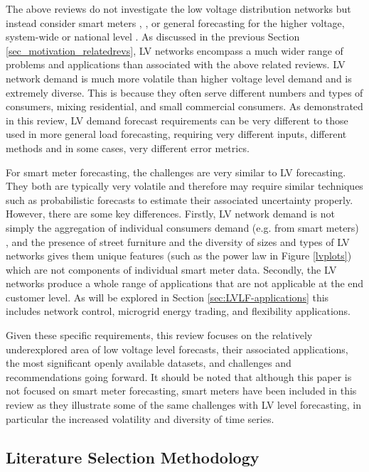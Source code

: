 The above reviews do not investigate the low voltage distribution networks but instead consider smart meters \cite{Tao2020efa}, \cite{Yildiz2017rai}, or general forecasting for the higher voltage, system-wide or national level \cite{Tao2016pel}. As discussed in the previous Section \ref{sec_motivation_relatedrevs}, LV networks encompass a much wider range of problems and applications than associated with the above related reviews. LV network demand is much more volatile than higher voltage level demand and is extremely diverse. This is because they often serve different numbers and types of consumers, mixing residential, and small commercial consumers. As demonstrated in this review, LV demand forecast requirements can be very different to those used in more general load forecasting, requiring very different inputs, different methods and in some cases, very different error metrics. 

For smart meter forecasting, the challenges are very similar to LV forecasting. They both are typically very volatile and therefore may require similar techniques such as probabilistic forecasts to estimate their associated uncertainty properly. However, there are some key differences. Firstly, LV network demand is not simply the aggregation of individual consumers demand (e.g. from smart meters) \cite{Haben2019stl}, and the presence of street furniture and the diversity of sizes and types of LV networks gives them unique features (such as the power law in Figure \ref{lvplots}) which are not components of individual smart meter data. Secondly, the LV networks produce a whole range of applications that are not applicable at the end customer level. As will be explored in Section \ref{sec:LVLF-applications} this includes network control, microgrid energy trading, and flexibility applications. 

Given these specific requirements, this review focuses on the relatively underexplored area of low voltage level forecasts, their associated applications, the most significant openly available datasets, and challenges and recommendations going forward. It should be noted that although this paper is not focused on smart meter forecasting, smart meters have been included in this review as they illustrate some of the same challenges with LV level forecasting, in particular the increased volatility and diversity of time series.


\subsection{Literature Selection Methodology}
\label{sec:lit_selection_methodology}

